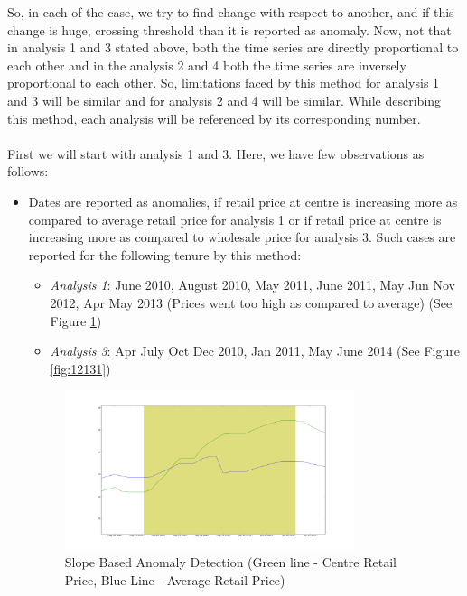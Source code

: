 \documentclass[a4paper,10pt]{report}
\begin{document}
		So, in each of the case, we try to find change with respect to another, and if this change is huge, crossing threshold than it is reported as anomaly. Now, not that in analysis 1 and 3 stated above, both the time series are directly proportional to each other and in the analysis 2 and 4 both the time series are inversely proportional to each other. So, limitations faced by this method for analysis 1 and 3 will be similar and for analysis 2 and 4 will be similar. While describing this method, each analysis will be referenced by its corresponding number.\\
		\\
		First we will start with analysis 1 and 3. Here, we have few observations as follows:
		
			
		\begin{itemize}
		
			\item Dates are reported as anomalies, if retail price at centre is increasing more as compared to average retail price for analysis 1 or if retail price at centre is increasing more as compared to wholesale price for analysis 3.
			Such cases are reported for the following tenure by this method:
			\begin{itemize}
				\item \textit{Analysis 1}: June 2010, August 2010, May 2011, June 2011, May Jun Nov 2012, Apr May 2013 (Prices went too high as compared to average) (See Figure \ref{fig:12111})
				\item \textit{Analysis 3}: Apr July Oct Dec 2010, Jan 2011, May June 2014 (See Figure \ref{fig:12131})
			\end{itemize}
			\begin{figure}[H]
		    	\centering
  		    	\includegraphics[width=0.8\textwidth]{graphs/12111.png}
		    	\caption{Slope Based Anomaly Detection (Green line - Centre Retail Price, Blue Line - Average Retail Price)}
		    	\label{fig:12111}
			\end{figure}
			

\end{itemize}
\end{document}
